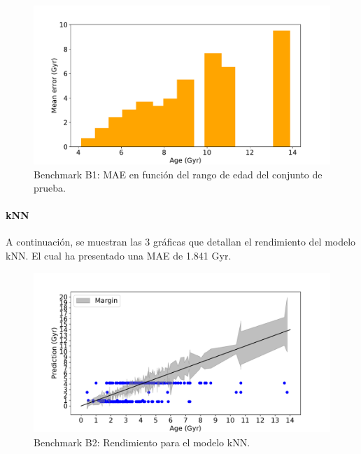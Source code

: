 \begin{figure}[H]
\begin{center}
 \includegraphics[width=0.8\linewidth]{Figuras/Experimentos/B_B1_gp_3.pdf}
\end{center}
\caption{Benchmark B1: MAE en función del rango de edad del conjunto de prueba.}
 \label{fig:benchB1_details_gp_3}
\end{figure}

\paragraph{kNN} 
A continuación, se muestran las 3 gráficas que detallan el rendimiento del modelo kNN. El cual ha presentado una MAE de 1.841 Gyr.
\begin{figure}[H]
\begin{center}
 \includegraphics[width=0.8\linewidth]{Figuras/Experimentos/B_B2_knn_1.pdf}
\end{center}
\caption{Benchmark B2: Rendimiento para el modelo kNN.}
 \label{fig:benchB2_details_knn_1}
\end{figure}

